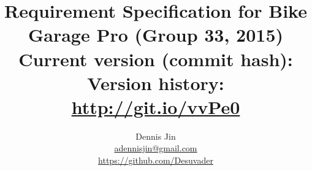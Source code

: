 \title{
	Requirement Specification for Bike Garage Pro (Group 33, 2015)\\
	\vspace{0.2in}
	\normalsize Current version (commit hash): \gitAbbrevHash\\
	\normalsize Version history: \url{http://git.io/vvPe0}
}
\author{
	Dennis Jin\\
	\url{adennisjin@gmail.com}\\
	\url{https://github.com/Desuvader}\\
}
\date{}